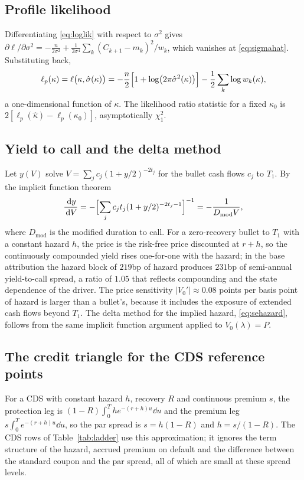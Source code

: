 \subsection{Profile likelihood}

Differentiating \eqref{eq:loglik} with respect to $\sigma^2$ gives
$\partial\ell/\partial\sigma^2=-\frac{n}{2\sigma^2}+\frac1{2\sigma^4}\sum_k(C_{k+1}-m_k)^2/w_k$,
which vanishes at \eqref{eq:sigmahat}. Substituting back,
\[
  \ell_p(\kappa)=\ell\bigl(\kappa,\hat\sigma(\kappa)\bigr)
  =-\frac n2\Bigl[1+\log\bigl(2\pi\hat\sigma^2(\kappa)\bigr)\Bigr]-\frac12\sum_k\log w_k(\kappa),
\]
a one-dimensional function of $\kappa$. The likelihood ratio statistic for a fixed $\kappa_0$
is $2[\ell_p(\hat\kappa)-\ell_p(\kappa_0)]$, asymptotically $\chi^2_1$.

\subsection{Yield to call and the delta method}

Let $y(V)$ solve $V=\sum_jc_j(1+y/2)^{-2t_j}$ for the bullet cash flows $c_j$ to $T_1$. By the
implicit function theorem
\[
  \frac{\,\mathrm{d} y}{\,\mathrm{d} V}=-\Bigl[\sum_jc_jt_j(1+y/2)^{-2t_j-1}\Bigr]^{-1}=-\frac{1}{D_{\mathrm{mod}}V},
\]
where $D_{\mathrm{mod}}$ is the modified duration to call. For a zero-recovery bullet to
$T_1$ with a constant hazard $h$, the price is the risk-free price discounted at $r+h$, so the
continuously compounded yield rises one-for-one with the hazard; in the base attribution the
hazard block of $219$bp of hazard produces $231$bp of semi-annual yield-to-call spread, a ratio
of $1.05$ that reflects compounding and the state dependence of the driver. The price
sensitivity $|V_0'|\approx0.08$ points per basis point of hazard is larger than a bullet's,
because it includes the exposure of extended cash flows beyond $T_1$. The delta method for the
implied hazard, \eqref{eq:sehazard}, follows from the same implicit function argument applied
to $V_0(\lambda)=P$.

\subsection{The credit triangle for the CDS reference points}

For a CDS with constant hazard $h$, recovery $R$ and continuous premium $s$, the protection
leg is $(1-R)\int_0^Th e^{-(r+h)u}\dd u$ and the premium leg $s\int_0^Te^{-(r+h)u}\dd u$, so the
par spread is $s=h(1-R)$ and $h=s/(1-R)$. The CDS rows of Table~\ref{tab:ladder} use this
approximation; it ignores the term structure of the hazard, accrued premium on default and
the difference between the standard coupon and the par spread, all of which are small at
these spread levels.

